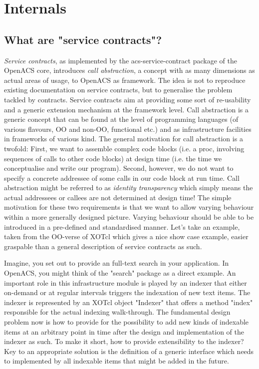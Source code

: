   \section{Internals}\label{sec:internal}
  \subsection{What are "service contracts"?}\label{sec:internal:contracts}
\emph{Service contracts}, as implemented by the acs-service-contract package of the OpenACS core, introduces \emph{call abstraction}, a concept with as many dimensions as actual areas of usage, to OpenACS as framework. The idea is not to reproduce existing documentation on service contracts, but to generalise the problem tackled by contracts. Service contracts aim at providing some sort of re-usability and a generic extension mechanism at the framework level. Call abstraction is a generic concept that can be found at the level of programming languages (of various flavours, OO and non-OO, functional etc.) and as infrastructure facilities in frameworks of various kind. The general motivation for call abstraction is a twofold: First, we want to assemble complex code blocks (i.e. a proc, involving sequences of calls to other code blocks) at design time (i.e. the time we conceptualise and write our program). Second, however, we do not want to specify a concrete addressee of some calls in our code block at run time. Call abstraction might be referred to as \emph{identity transparency} which simply means the actual addressees or callees are not determined at design time! The simple motivation for these two requirements is that we want to allow varying behaviour within a more generally designed picture. Varying behaviour should be able to be introduced in a pre-defined and standardised manner. Let's take an example, taken from the OO-verse of XOTcl which gives a nice show case example, easier graspable than a general description of service contracts as such. 
%

%
Imagine, you set out to provide an full-text search in your application. In OpenACS, you might think of the "search" package as a direct example. An important role in this infrastructure module is played by an indexer that either on-demand or at regular intervals triggers the indexation of new text items. The indexer is represented by an XOTcl object  "Indexer" that offers a method "index" responsible for the actual indexing walk-through. The fundamental design problem now is how to provide for the possibility to add new kinds of indexable items at an arbitrary point in time after the design and implementation of the indexer as such. To make it short, how to provide extensibility to the indexer? Key to an appropriate solution is the definition of a generic interface which needs to implemented by all indexable items that might be added in the future. 

